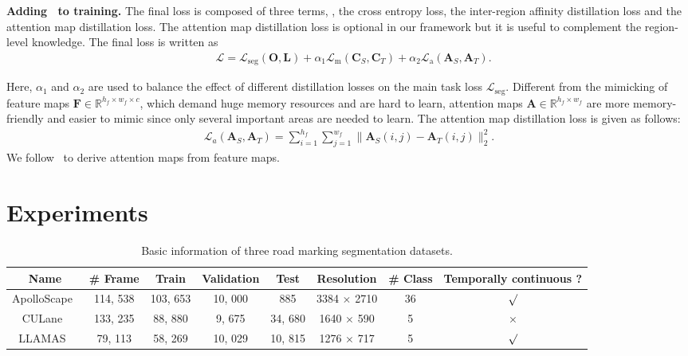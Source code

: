 \documentclass[10pt,twocolumn,letterpaper]{article}
\begin{document}
\noindent \textbf{Adding \algorithmname~to training.} The final loss is composed of three terms, \ie, the cross entropy loss, the inter-region affinity distillation loss and the attention map distillation loss. The attention map distillation loss is optional in our framework but it is useful to complement the region-level knowledge. The final loss is written as
\begin{equation}
\label{eqn:total_loss}
\begin{split}
& \mathcal{L} = \mathcal{L}_\mathrm{seg}(\mathbf{O}, \mathbf{L}) + \alpha_{1} \mathcal{L}_\mathrm{m}(\mathbf{C}_{S}, \mathbf{C}_{T}) + \alpha_{2} \mathcal{L}_\mathrm{a}(\mathbf{A}_{S}, \mathbf{A}_{T}).
\end{split}
\end{equation}

\noindent Here, $\alpha_{1}$ and $\alpha_{2}$ are used to balance the effect of different distillation losses on the main task loss $\mathcal{L}_\mathrm{seg}$. Different from the mimicking of feature maps $\mathbf{F} \in \mathbb{R}^{h_{f} \times w_{f} \times c}$, which demand huge memory resources and are hard to learn, attention maps $\mathbf{A} \in \mathbb{R}^{h_{f} \times w_{f}}$ are more memory-friendly and easier to mimic since only several important areas are needed to learn. The attention map distillation loss is given as follows:
\begin{equation}
\label{eqn:pixel_loss_attention}
\begin{split}
\mathcal{L}_{a}( \mathbf{A}_{S}, \mathbf{A}_{T}) = \sum_{i=1}^{h_{f}} \sum_{j=1}^{w_{f}} \| \mathbf{A}_{S}(i, j) - \mathbf{A}_{T}(i, j) \|_{2}^{2}.
\end{split}
\end{equation}
\noindent We follow~\cite{zagoruyko2016paying} to derive attention maps from feature maps.

 
\section{Experiments}
\label{sec:experiments}


\begin{table*}[!t]
\caption{Basic information of three road marking segmentation datasets.}
\vskip 0.1cm
\label{dataset_table}
\centering
\small{
\begin{tabular}{c|c|c|c|c|c|c|c}
\hline
Name & \# Frame & Train & Validation & Test & Resolution & \# Class & Temporally continuous ? \\
\hline
\hline
ApolloScape~\cite{huang2018apolloscape} & 114, 538 & 103, 653 & 10, 000 & 885 & 3384 $\times$ 2710 & 36 & $\surd$ \\
CULane~\cite{pan2017spatial} & 133, 235 & 88, 880 & 9, 675 & 34, 680 & 1640 $\times$ 590 & 5 & $\times$ \\
LLAMAS~\cite{llamas2019} & 79, 113 & 58, 269 & 10, 029 & 10, 815 & 1276 $\times$ 717 & 5 & $\surd$ \\
\hline
\end{tabular}
}
\vspace{-4ex}
\end{table*}
\end{document}
